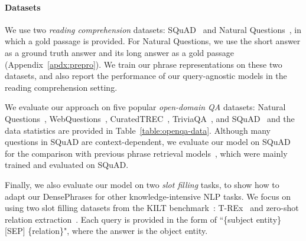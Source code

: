 \documentclass[11pt,a4paper]{article}
\newcommand{\ours}{DensePhrases}
\newcommand\ti[1]{\textit{#1}}
\begin{document}
\paragraph{Datasets}
We use two \ti{reading comprehension} datasets: SQuAD~\citep{rajpurkar2016squad} and Natural Questions~\citep{kwiatkowski2019natural}, in which a gold passage is provided.
For Natural Questions, we use the short answer as a ground truth answer  and its long answer as a gold passage  (Appendix~\ref{apdx:prepro}). We train our phrase representations on these two datasets, and also report the performance of our query-agnostic models in the reading comprehension setting.


We evaluate our approach on five popular \ti{open-domain QA} datasets: Natural Questions~\citep{kwiatkowski2019natural}, WebQuestions~\citep{berant2013semantic}, CuratedTREC~\citep{baudivs2015modeling}, TriviaQA~\citep{joshi2017triviaqa}, and SQuAD~\citep{rajpurkar2016squad} and the data statistics are provided in Table~\ref{table:openqa-data}.
Although many questions in SQuAD are context-dependent, we evaluate our model on SQuAD for the comparison with previous phrase retrieval models~\citep{seo2019real,lee2020contextualized}, which were mainly trained and evaluated on SQuAD.

Finally, we also evaluate our model on two \ti{slot filling} tasks, to show how to adapt our {\ours} for other knowledge-intensive NLP tasks.
We focus on using two slot filling datasets from the KILT benchmark~\citep{petroni2020kilt}: T-REx~\citep{elsahar2018t} and zero-shot relation extraction~\citep{levy2017zero}.
Each query is provided in the form of ``\{subject entity\} [SEP] \{relation\}", where the answer is the object entity.
\end{document}
